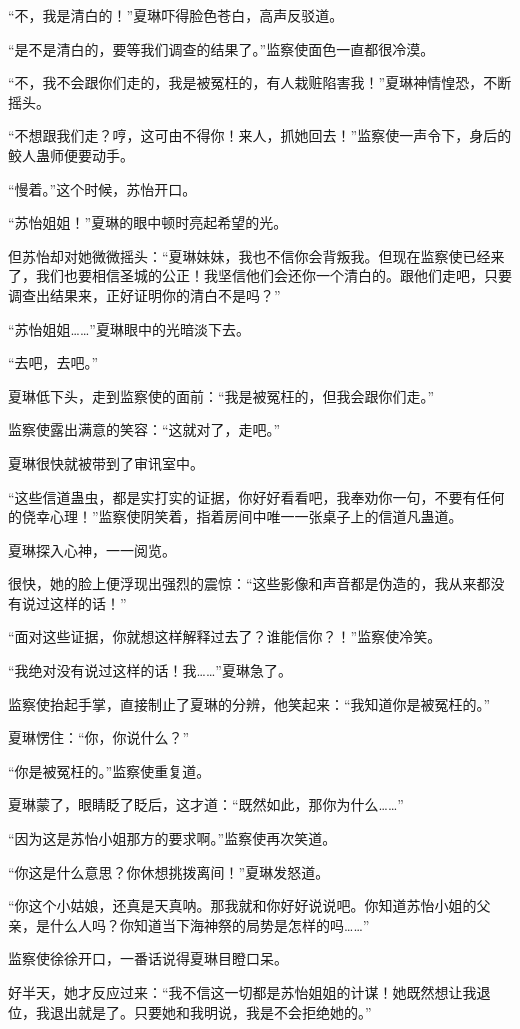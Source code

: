 \begin{this_body}
“不，我是清白的！”夏琳吓得脸色苍白，高声反驳道。

“是不是清白的，要等我们调查的结果了。”监察使面色一直都很冷漠。

“不，我不会跟你们走的，我是被冤枉的，有人栽赃陷害我！”夏琳神情惶恐，不断摇头。

“不想跟我们走？哼，这可由不得你！来人，抓她回去！”监察使一声令下，身后的鲛人蛊师便要动手。

“慢着。”这个时候，苏怡开口。

“苏怡姐姐！”夏琳的眼中顿时亮起希望的光。

但苏怡却对她微微摇头：“夏琳妹妹，我也不信你会背叛我。但现在监察使已经来了，我们也要相信圣城的公正！我坚信他们会还你一个清白的。跟他们走吧，只要调查出结果来，正好证明你的清白不是吗？”

“苏怡姐姐……”夏琳眼中的光暗淡下去。

“去吧，去吧。”

夏琳低下头，走到监察使的面前：“我是被冤枉的，但我会跟你们走。”

监察使露出满意的笑容：“这就对了，走吧。”

夏琳很快就被带到了审讯室中。

“这些信道蛊虫，都是实打实的证据，你好好看看吧，我奉劝你一句，不要有任何的侥幸心理！”监察使阴笑着，指着房间中唯一一张桌子上的信道凡蛊道。

夏琳探入心神，一一阅览。

很快，她的脸上便浮现出强烈的震惊：“这些影像和声音都是伪造的，我从来都没有说过这样的话！”

“面对这些证据，你就想这样解释过去了？谁能信你？！”监察使冷笑。

“我绝对没有说过这样的话！我……”夏琳急了。

监察使抬起手掌，直接制止了夏琳的分辨，他笑起来：“我知道你是被冤枉的。”

夏琳愣住：“你，你说什么？”

“你是被冤枉的。”监察使重复道。

夏琳蒙了，眼睛眨了眨后，这才道：“既然如此，那你为什么……”

“因为这是苏怡小姐那方的要求啊。”监察使再次笑道。

“你这是什么意思？你休想挑拨离间！”夏琳发怒道。

“你这个小姑娘，还真是天真呐。那我就和你好好说说吧。你知道苏怡小姐的父亲，是什么人吗？你知道当下海神祭的局势是怎样的吗……”

监察使徐徐开口，一番话说得夏琳目瞪口呆。

好半天，她才反应过来：“我不信这一切都是苏怡姐姐的计谋！她既然想让我退位，我退出就是了。只要她和我明说，我是不会拒绝她的。”


\end{this_body}
